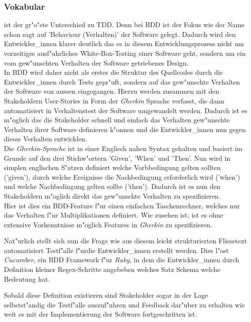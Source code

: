 \documentclass[runningheads,a4paper]{llncs}
\begin{document}
    \subsubsection{Vokabular}
      ist der gr"o"ste Unterschied zu TDD. Denn bei BDD
      ist der Fokus wie der Name schon sagt auf 'Behaviour (Verhalten)' der 
      Software gelegt. Dadurch wird den Entwickler\_innen klarer deutlich
      das es in diesem Entwicklungsprozess nicht um vorzeitiges ausf"uhrliches
      White-Box-Testing einer Software geht, sondern um ein vom gew"unschten 
      Verhalten der Software getriebenes Design.\\
      In BDD wird daher nicht als erstes die Struktur des Quellcodes durch die 
      Entwickler\_innen durch Tests gepr"uft, sondern auf das gew"unschte
      Verhalten der Software von aussen eingegangen. Hierzu werden zusammen
      mit den Stakeholdern User-Stories in Form der {\em Gherkin}\cite{Gherkin} Sprache verfasst, die
      dann automatisiert in Verhaltenstest der Software umgewandelt werden.
      Dadurch ist es m"oglich das die Stakeholder schnell und einfach das 
      Verhalten gew"unschte Verhalten ihrer Software definieren k"onnen und
      die Entwickler\_innen nun gegen dieses Verhalten entwicklen.\\
      Die {\em Gherkin-Sprache} ist in einer Englisch nahen Syntax 
      gehalten und basiert im Grunde auf den drei Stichw"ortern 'Given', 'When' 
      und 'Then'. Nun wird in simplen englischen S"atzen definiert welche 
      Vorbbedingung gelten sollten ('given'), durch welche Ereignisse die 
      Nachbedingung erforderlich wird ('when') und welche Nachbedingung gelten
      sollte ('then'). Dadurch ist es nun den Stakeholdern m"oglich direkt 
      das gew"unschte Verhalten zu spezifizieren.\\
      Hier ist dies ein BDD-Feature f"ur einen einfachen Taschenrechner, welches
      nur das Verhalten f"ur Multiplikationen definiert. Wie zusehen ist, ist 
      es ohne extensive Vorkenntnisse m"oglich Features in {\em Gherkin} zu spezifizieren.
      
      Nat"urlich stellt sich nun die Frage wie aus diesem leicht strukturierten
      Fliesstext automatisiert Testf"alle f"urdie Entwickler\_innen erstellt werden.
      Dies l"ost {\em Cucumber}\cite{Cucumber}, ein BDD Framework f"ur {\em Ruby}, in dem die Entwickler\_innen durch Definition kleiner Regex-Schritte angebeben 
      welches Satz Schema welche Bedeutung hat.
      
      Sobald diese Definition existieren sind Stakeholder sogar in der Lage
      selbstst"andig die Testf"alle auszuf"uhren und Feedback dar"uber zu 
      erhalten wie weit es mit der Implementierung der Software fortgeschritten
      ist.\\\\
\end{document}
